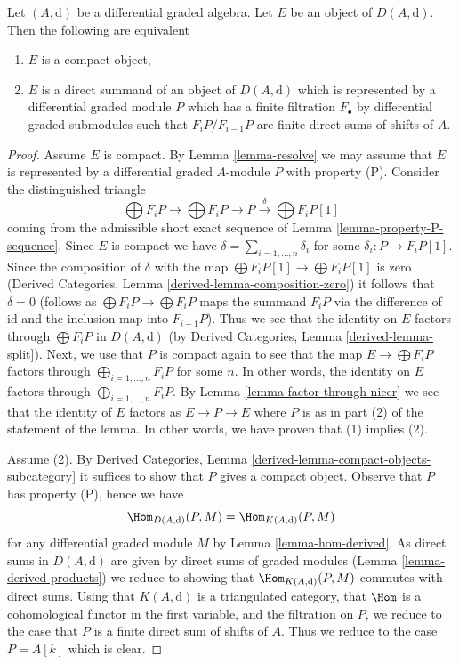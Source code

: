 \begin{proposition}
\label{proposition-compact}
Let $(A, \text{d})$ be a differential graded algebra. Let $E$ be an
object of $D(A, \text{d})$. Then the following are equivalent
\begin{enumerate}
\item $E$ is a compact object,
\item $E$ is a direct summand of an object of $D(A, \text{d})$
which is represented by a differential graded module $P$ which
has a finite filtration $F_\bullet$ by differential graded submodules
such that $F_iP/F_{i - 1}P$ are finite direct sums of shifts of $A$.
\end{enumerate}
\end{proposition}

\begin{proof}
Assume $E$ is compact. By Lemma \ref{lemma-resolve} we may assume that $E$
is represented by a differential graded $A$-module $P$ with property (P).
Consider the distinguished triangle
$$
\bigoplus F_iP \to \bigoplus F_iP \to P
\xrightarrow{\delta} \bigoplus F_iP[1]
$$
coming from the admissible short exact sequence of
Lemma \ref{lemma-property-P-sequence}. Since $E$ is compact we have
$\delta = \sum_{i = 1, \ldots, n} \delta_i$ for some
$\delta_i : P \to F_iP[1]$. Since the composition of $\delta$
with the map $\bigoplus F_iP[1] \to \bigoplus F_iP[1]$ is zero
(Derived Categories, Lemma \ref{derived-lemma-composition-zero})
it follows that $\delta = 0$ (follows as $\bigoplus F_iP \to \bigoplus F_iP$
maps the summand $F_iP$ via the difference of $\text{id}$ and the inclusion
map into $F_{i - 1}P$).
Thus we see that the identity on $E$ factors through
$\bigoplus F_iP$ in $D(A, \text{d})$ (by
Derived Categories, Lemma \ref{derived-lemma-split}).
Next, we use that $P$ is compact again to see that the map
$E \to \bigoplus F_iP$ factors through $\bigoplus_{i = 1, \ldots, n} F_iP$
for some $n$. In other words, the identity on $E$ factors through
$\bigoplus_{i = 1, \ldots, n} F_iP$. By
Lemma \ref{lemma-factor-through-nicer}
we see that the identity of $E$ factors as $E \to P \to E$
where $P$ is as in part (2) of the statement of the lemma.
In other words, we have proven that (1) implies (2).

\medskip\noindent
Assume (2). By
Derived Categories, Lemma \ref{derived-lemma-compact-objects-subcategory}
it suffices to show that $P$ gives a compact object. Observe that
$P$ has property (P), hence we have
$$
\Hom_{D(A, \text{d})}(P, M) = \Hom_{K(A, \text{d})}(P, M)
$$
for any differential graded module $M$ by Lemma \ref{lemma-hom-derived}.
As direct sums in $D(A, \text{d})$ are given by direct sums of
graded modules (Lemma \ref{lemma-derived-products}) we reduce
to showing that $\Hom_{K(A, \text{d})}(P, M)$ commutes with direct
sums. Using that $K(A, \text{d})$ is a triangulated category,
that $\Hom$ is a cohomological functor in the first
variable, and the filtration on $P$, we reduce to the case that
$P$ is a finite direct sum of shifts of $A$. Thus we reduce to
the case $P = A[k]$ which is clear.
\end{proof}
